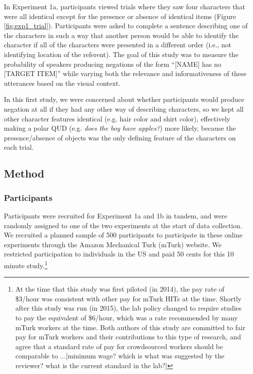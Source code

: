\documentclass[man, floatsintext, noapacite]{apa6}
\begin{document}
In Experiment 1a, participants viewed trials where they saw four characters that were all identical except for the presence or absence of identical items (Figure \ref{fig:exp1_trial}). Participants were asked to complete a sentence describing one of the characters in such a way that another person would be able to identify the character if all of the characters were presented in a different order (i.e., not identifying location of the referent). The goal of this study was to measure the probability of speakers producing negations of the form ``[NAME] has no [TARGET ITEM]'' while varying both the relevance and informativeness of these utterances based on the visual context. 

In this first study, we were concerned about whether participants would produce negation at all if they had any other way of describing characters, so we kept all other character features identical (e.g. hair color and shirt color), effectively making a polar QUD (e.g. \textit{does the boy have apples?}) more likely, because the presence/absence of objects was the only defining feature of the characters on each trial. 

\subsection{Method}

\subsubsection{Participants} 

Participants were recruited for Experiment 1a and 1b in tandem, and were randomly assigned to one of the two experiments at the start of data collection. We recruited a planned sample of 500 participants to participate in these online experiments through the Amazon Mechanical Turk (mTurk) website. We restricted participation to individuals in the US and paid 50 cents for this 10 minute study.\footnote{At the time that this study was first piloted (in 2014), the pay rate of \$3/hour was consistent with other pay for mTurk HITs at the time. Shortly after this study was run (in 2015), the lab policy changed to require studies to pay the equivalent of \$6/hour, which was a rate recommended by many mTurk workers at the time. Both authors of this study are committed to fair pay for mTurk workers and their contributions to this type of research, and agree that a standard rate of pay for crowdsourced workers should be comparable to ...[minimum wage? which is what was suggested by the reviewer? what is the current standard in the lab?]}
\end{document}
